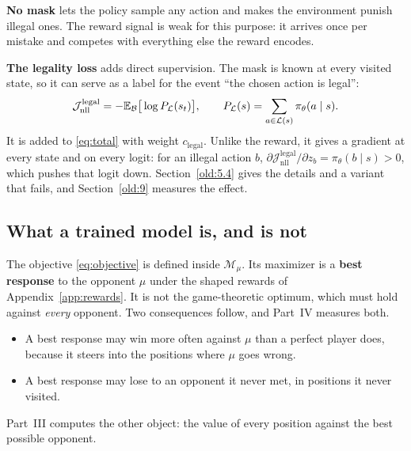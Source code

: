 \textbf{No mask} lets the policy sample any action and makes the environment punish illegal ones. The reward
signal is weak for this purpose: it arrives once per mistake and competes with everything else the reward
encodes.

\textbf{The legality loss} adds direct supervision. The mask is known at every visited state, so it can serve
as a label for the event ``the chosen action is legal'':
\[
\mathcal{J}^{\text{legal}}_{\text{nll}} = -\mathbb{E}_{\mathcal{B}}\big[\log P_{\mathcal{L}}(s_t)\big],
\qquad P_{\mathcal{L}}(s) = \sum_{a \in \mathcal{L}(s)} \pi_\theta(a \mid s).
\]
It is added to \eqref{eq:total} with weight $c_{\text{legal}}$. Unlike the reward, it gives a gradient at every
state and on every logit: for an illegal action $b$, $\partial \mathcal{J}^{\text{legal}}_{\text{nll}} / \partial z_b = \pi_\theta(b \mid s) > 0$,
which pushes that logit down. Section~\ref{old:5.4} gives the details and a variant that fails, and
Section~\ref{old:9} measures the effect.

\subsection{What a trained model is, and is not}\label{sec:fp-br}

The objective \eqref{eq:objective} is defined inside $\mathcal{M}_\mu$. Its maximizer is a \textbf{best response}
to the opponent $\mu$ under the shaped rewards of Appendix~\ref{app:rewards}. It is not the game-theoretic
optimum, which must hold against \emph{every} opponent. Two consequences follow, and Part~IV measures both.

\begin{itemize}
\item A best response may win more often against $\mu$ than a perfect player does, because it steers into
  the positions where $\mu$ goes wrong.
\item A best response may lose to an opponent it never met, in positions it never visited.
\end{itemize}

Part~III computes the other object: the value of every position against the best possible opponent.
